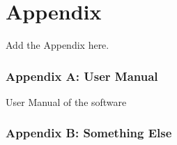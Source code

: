 
\chapter*{Appendix}

Add the Appendix here.


\subsection*{Appendix A: User Manual}

User Manual of the software

\subsection*{Appendix B: Something Else}

